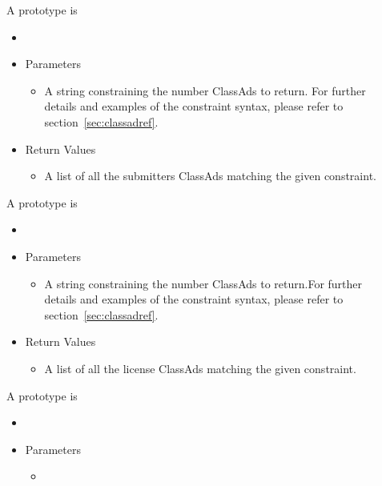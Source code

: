 \begin{description}
\item []
  A prototype is 

  \begin{itemize}
    \item[] 
    \item[] Parameters
    \begin{itemize}
      \item[]  

      A string constraining the number ClassAds to return. For further details 
      and examples of the constraint syntax, please refer to 
      section~\ref{sec:classadref}.
    \end{itemize}
    \item[] Return Values
    \begin{itemize}
      \item[] A list of all the submitters ClassAds matching the given 
        constraint.
    \end{itemize}
  \end{itemize}

\item []
  A prototype is 

  \begin{itemize}
    \item[] 
    \item[] Parameters
    \begin{itemize}
      \item[]  

      A string constraining the number ClassAds to return.For further details 
      and examples of the constraint syntax, please refer to 
      section~\ref{sec:classadref}.
    \end{itemize}
    \item[] Return Values
    \begin{itemize}
      \item[] A list of all the license ClassAds matching the given constraint.
    \end{itemize}
  \end{itemize}
  
\item []
  A prototype is 

  \begin{itemize}
    \item[] 
    \item[] Parameters
    \begin{itemize}
      \item[] 


\end{itemize}
\end{itemize}
\end{description}
